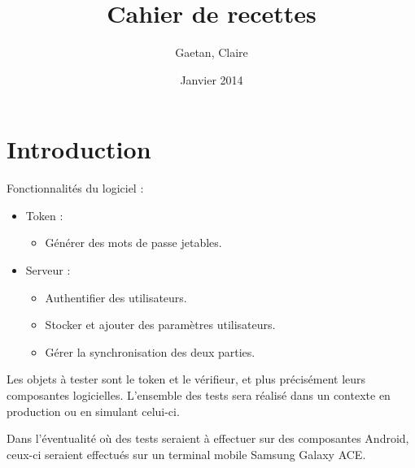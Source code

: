 \documentclass{"../../res/univ-projet"}
\title{Cahier de recettes}
\author{\bsc{Ferry} Gaetan, \bsc{Hardouin} Claire}
\date{Janvier 2014}
\begin{document}
  \maketitle
  \section{Introduction}
  Fonctionnalités du logiciel :
  \begin{itemize}
    \item Token : 
    \begin{itemize}
      \item Générer des mots de passe jetables.
    \end{itemize}

    \item Serveur :
    \begin{itemize}
      \item Authentifier des utilisateurs.
      \item Stocker et ajouter des paramètres utilisateurs.
      \item Gérer la synchronisation des deux parties.
    \end{itemize}
  \end{itemize}

  Les objets à tester sont le token et le vérifieur, et plus précisément leurs composantes logicielles. L'ensemble des tests sera réalisé dans un contexte \og{}en 
  production\fg{} ou en simulant celui-ci.
  
  Dans l'éventualité o\`u des tests seraient à effectuer sur des composantes Android, ceux-ci seraient effectués sur un terminal mobile Samsung Galaxy ACE.
  
\end{document}
